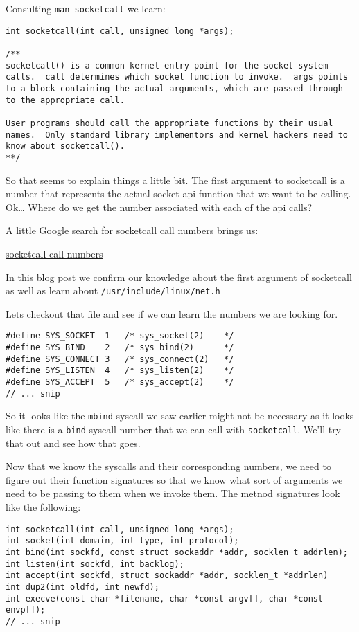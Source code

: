 \documentclass[11pt]{article}
\begin{document}
Consulting \verb~man socketcall~ we learn:

\begin{verbatim}
int socketcall(int call, unsigned long *args);

/**
socketcall() is a common kernel entry point for the socket system
calls.  call determines which socket function to invoke.  args points
to a block containing the actual arguments, which are passed through
to the appropriate call.

User programs should call the appropriate functions by their usual
names.  Only standard library implementors and kernel hackers need to
know about socketcall().
**/
\end{verbatim}

So that seems to explain things a little bit. The first argument to
socketcall is a number that represents the actual socket api function
that we want to be calling. Ok\ldots{} Where do we get the number associated
with each of the api calls?

A little Google search for socketcall call numbers brings us:

\href{http://jkukunas.blogspot.com/2010/05/x86-linux-networking-system-calls.html}{socketcall call numbers}

In this blog post we confirm our knowledge about the first argument of
socketcall as well as learn about \verb~/usr/include/linux/net.h~

Lets checkout that file and see if we can learn the numbers we are looking
for.

\begin{verbatim}
#define SYS_SOCKET  1   /* sys_socket(2)    */
#define SYS_BIND    2   /* sys_bind(2)      */
#define SYS_CONNECT 3   /* sys_connect(2)   */
#define SYS_LISTEN  4   /* sys_listen(2)    */
#define SYS_ACCEPT  5   /* sys_accept(2)    */
// ... snip
\end{verbatim}

So it looks like the \verb~mbind~ syscall we saw earlier might not be
necessary as it looks like there is a \verb~bind~ syscall number that we
can call with \verb~socketcall~.  We'll try that out and see how that goes.

Now that we know the syscalls and their corresponding numbers, we need
to figure out their function signatures so that we know what sort of
arguments we need to be passing to them when we invoke them. The
metnod signatures look like the following:


\begin{verbatim}
int socketcall(int call, unsigned long *args);
int socket(int domain, int type, int protocol);
int bind(int sockfd, const struct sockaddr *addr, socklen_t addrlen);
int listen(int sockfd, int backlog);
int accept(int sockfd, struct sockaddr *addr, socklen_t *addrlen)
int dup2(int oldfd, int newfd);
int execve(const char *filename, char *const argv[], char *const envp[]);
// ... snip
\end{verbatim}
\end{document}

